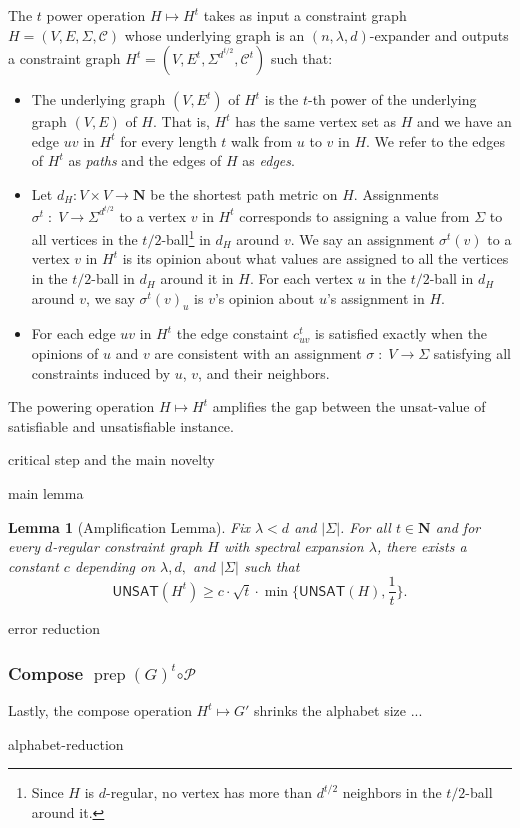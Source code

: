 \documentclass{article}
\newtheorem{lemma}[theorem]{Lemma}
\newenvironment{proof_idea}{\noindent {\bf Proof Idea:}
	\hspace*{1mm}}{\hspace*{\fill} $\Box$ }
\newcommand{\N}{{\mathbf N}}
\newcommand{\UNSAT}{\mathsf{UNSAT}}
\newcommand{\prep}{{\operatorname{prep}}}
\begin{document}
The $t$ power operation $H \mapsto H^t$ takes as input a
constraint graph $H = (V, E, \Sigma, \mathcal{C})$ whose
underlying graph is an $(n, \lambda, d)$-expander and outputs a
constraint graph $H^t = (V, E^t, \Sigma^{d^{t/2}}, \mathcal{C}^t)$
such that:
\begin{itemize}

\item
The underlying graph $(V, E^t)$ of $H^t$ is the $t$-th power of the
underlying graph $(V, E)$ of $H$.
That is, $H^t$ has the same vertex set as $H$ and we have an edge $uv$ in $H^t$
for every length $t$ walk from $u$ to $v$ in $H$.
We refer to the edges of $H^t$ as \emph{paths} and the edges of $H$ as \emph{edges}.

\item
Let $d_H : V \times V \to \N$ be the shortest path metric on $H$.
Assignments $\sigma^t \;:\; V \to \Sigma^{d^{t/2}}$ to a vertex $v$ in $H^t$
corresponds to assigning a value from $\Sigma$ to all vertices in the $t/2$-ball\footnote{
Since $H$ is $d$-regular, no vertex has more than $d^{t/2}$ neighbors in the
$t/2$-ball around it.}
in $d_H$ around $v$.
We say an assignment $\sigma^t(v)$ to a vertex $v$ in $H^t$ is its opinion
about what values are assigned to all the vertices in the $t/2$-ball in $d_H$
around it in $H$.
For each vertex $u$ in the $t/2$-ball in $d_H$ around $v$, we say $\sigma^t(v)_u$ is
$v$'s opinion about $u$'s assignment in $H$. 

\item
For each edge $uv$ in $H^t$ the edge constaint $c_{uv}^t$ is satisfied
exactly when the opinions of $u$ and $v$ are consistent with an
assignment $\sigma \;:\; V \to \Sigma$ satisfying all constraints induced by
$u$, $v$, and their neighbors.

\end{itemize}

The powering operation $H \mapsto H^t$ amplifies the gap between the
unsat-value of satisfiable and unsatisfiable instance.

critical step and the main novelty

main lemma

\begin{lemma}[Amplification Lemma]
Fix $\lambda < d$ and $|\Sigma|$.
For all $t \in \N$ and for every $d$-regular constraint graph $H$ with
spectral expansion $\lambda$, there exists a constant $c$ depending
on $\lambda, d,$ and $|\Sigma|$ such that
$$
\UNSAT(H^t) \ge c\cdot\sqrt{t}\cdot\min\{\UNSAT(H), \frac{1}{t}\}.
$$
\end{lemma}

\begin{proof_idea}
error reduction
\end{proof_idea}

\subsubsection*{Compose $\prep(G)^t \boldsymbol{\circ \mathcal{P}}$}

Lastly, the compose operation $H^t \mapsto G'$ shrinks the alphabet size ...

alphabet-reduction

\newpage



\end{document}
